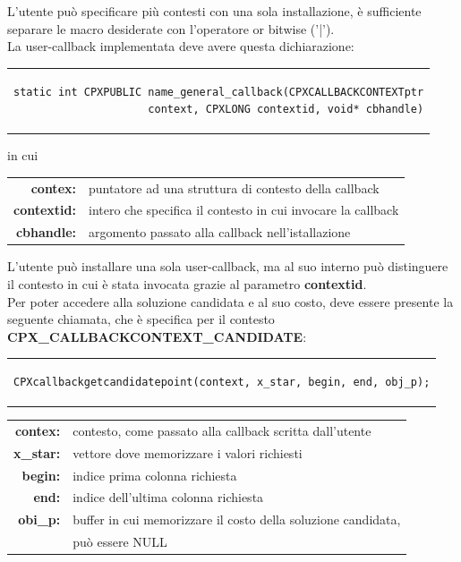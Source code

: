 L'utente può specificare più contesti con una sola installazione, è sufficiente separare le macro desiderate con l'operatore or bitwise ('|').\\
La user-callback implementata deve avere questa dichiarazione:
\begin{center}
\begin{tabular}{c}
\begin{lstlisting}[linewidth=382pt, basicstyle=\footnotesize\sffamily,]    
static int CPXPUBLIC name_general_callback(CPXCALLBACKCONTEXTptr
                     context, CPXLONG contextid, void* cbhandle)
\end{lstlisting}
\end{tabular}
\end{center}
in cui
\begin{table}[h]
\centering
\begin{tabular}{rl}
\textbf{contex:} & {puntatore ad una struttura di contesto della callback}\\
\textbf{contextid:} & {intero che specifica il contesto in cui invocare la callback}\\
\textbf{cbhandle:} & {argomento passato alla callback nell'istallazione}\\
\end{tabular}
\end{table}
L'utente può installare una sola user-callback, ma al suo interno può distinguere il contesto in cui è stata invocata grazie al parametro \textbf{contextid}.\\
Per poter accedere alla soluzione candidata e al suo costo, deve essere presente la seguente chiamata, che è specifica per il contesto \textbf{CPX\_CALLBACKCONTEXT\_CANDIDATE}:
\begin{center}
\begin{tabular}{c}
\begin{lstlisting}[linewidth=385pt, basicstyle=\footnotesize\sffamily,]    
CPXcallbackgetcandidatepoint(context, x_star, begin, end, obj_p);
\end{lstlisting}
\end{tabular}
\end{center}
\vspace{2cm}
\begin{table}[h]
\centering
\begin{tabular}{rl}
\textbf{contex:} & {contesto, come passato alla callback scritta dall'utente}\\
\textbf{x\_star:} & {vettore dove memorizzare i valori richiesti}\\
\textbf{begin:} & {indice prima colonna richiesta}\\
\textbf{end:} & {indice dell'ultima colonna richiesta}\\
\textbf{obi\_p:} & {buffer in cui memorizzare il costo della soluzione candidata,}\\
&{può essere NULL}\\
\end{tabular}
\end{table}
